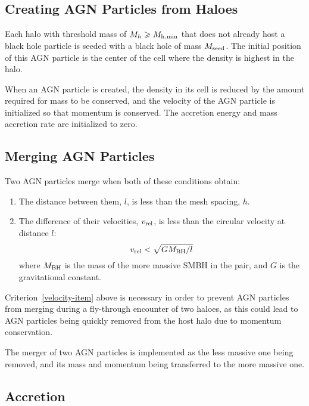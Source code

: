 \subsection{Creating AGN Particles from Haloes}


Each halo with threshold mass of $M_h \geqslant M_{\rm h, min}$
that does not already host a black hole particle is seeded with
a black hole of mass $M_{\rm seed}$.
The initial position of this AGN particle is
the center of the cell where the density is highest in the halo.

When an AGN particle is created,
the density in its cell is reduced by the amount required for
mass to be conserved, and
the velocity of the AGN particle is initialized so that
momentum is conserved.
The accretion energy and mass accretion rate are initialized to zero.

\subsection{Merging AGN Particles}

Two AGN particles merge when both of these conditions obtain:
\begin{enumerate}
\item 
The distance between them, $l$, is less than the mesh spacing, $h$.
\item
\label{velocity-item}
The difference of their velocities, $v_{\rm rel}$,
is less than the circular velocity at distance $l$:
$$ v_{\rm rel} < \sqrt{GM_{\rm BH}/l}$$
where $M_{\rm BH}$ is the mass of the more massive SMBH in the pair,
and $G$ is the gravitational constant.
\end{enumerate}
Criterion~\ref{velocity-item} above
is necessary in order to prevent AGN particles from merging during
a fly-through encounter of two haloes, as this could lead to AGN particles
being quickly removed from the host halo due to momentum conservation.

The merger of two AGN particles is implemented as the less massive one
being removed, and its mass and momentum being transferred to the
more massive one.

\subsection{Accretion}

